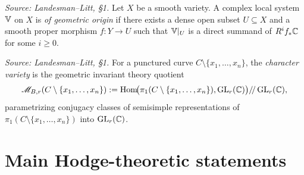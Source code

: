 \begin{definition}
  \label{def:geometric-origin}
  \textit{Source: Landesman--Litt, \S1.}
  Let $X$ be a smooth variety. A complex local system $\mathbb{V}$ on $X$ is \emph{of
  geometric origin} if there exists a dense open subset $U \subseteq X$ and a
  smooth proper morphism $f : Y \to U$ such that $\mathbb{V}|_U$ is a direct summand of
  $R^i f_* \mathbb{C}$ for some $i \ge 0$.
\end{definition}

\begin{definition}
  \label{def:character-variety}
  \textit{Source: Landesman--Litt, \S1.}
  For a punctured curve $C \setminus \{x_1, \ldots, x_n\}$, the \emph{character
  variety} is the geometric invariant theory quotient
  \[
    \mathscr{M}_{B,r}(C \setminus \{x_1, \ldots, x_n\})
      := \operatorname{Hom}\!\bigl(\pi_1(C \setminus \{x_1, \ldots, x_n\}), \operatorname{GL}_r(\mathbb{C})\bigr)
         /\!/ \operatorname{GL}_r(\mathbb{C}),
  \]
  parametrizing conjugacy classes of semisimple representations of
  $\pi_1(C \setminus \{x_1, \ldots, x_n\})$ into $\operatorname{GL}_r(\mathbb{C})$.
\end{definition}

\section{Main Hodge-theoretic statements}

